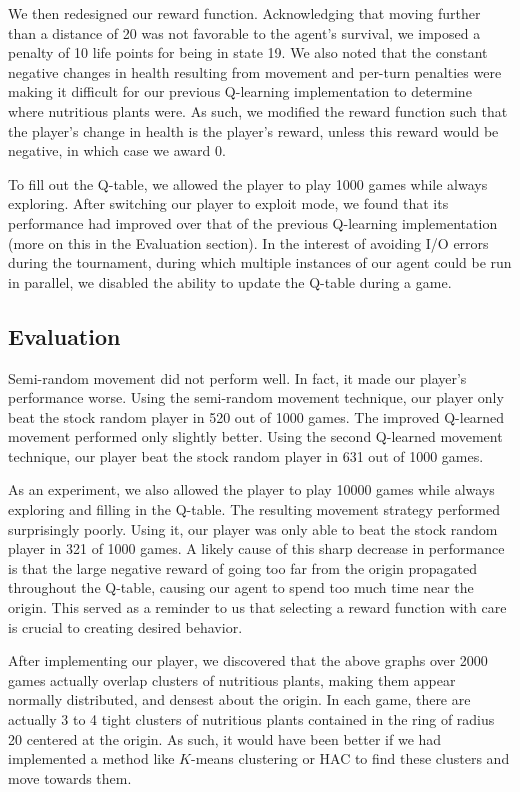 \documentclass[solution, letterpaper]{cs121}
\begin{document}
We then redesigned our reward function. Acknowledging that moving further than a distance of 20 was not favorable to the agent's survival, we imposed a penalty of 10 life points for being in state 19. We also noted that the constant negative changes in health resulting from movement and per-turn penalties were making it difficult for our previous Q-learning implementation to determine where nutritious plants were. As such, we modified the reward function such that the player's change in health is the player's reward, unless this reward would be negative, in which case we award 0.

To fill out the Q-table, we allowed the player to play 1000 games while always exploring. After switching our player to exploit mode, we found that its performance had improved over that of the previous Q-learning implementation (more on this in the Evaluation section). In the interest of avoiding I/O errors during the tournament, during which multiple instances of our agent could be run in parallel, we disabled the ability to update the Q-table during a game.

\subsection{Evaluation}
\hspace{4mm} Semi-random movement did not perform well. In fact, it made our player's performance worse. Using the semi-random movement technique, our player only beat the stock random player in 520 out of 1000 games. The improved Q-learned movement performed only slightly better. Using the second Q-learned movement technique, our player beat the stock random player in 631 out of 1000 games.

As an experiment, we also allowed the player to play 10000 games while always exploring and filling in the Q-table. The resulting movement strategy performed surprisingly poorly. Using it, our player was only able to beat the stock random player in 321 of 1000 games. A likely cause of this sharp decrease in performance is that the large negative reward of going too far from the origin propagated throughout the Q-table, causing our agent to spend too much time near the origin. This served as a reminder to us that selecting a reward function with care is crucial to creating desired behavior.

After implementing our player, we discovered that the above graphs over 2000 games actually overlap clusters of nutritious plants, making them appear normally distributed, and densest about the origin. In each game, there are actually 3 to 4 tight clusters of nutritious plants contained in the ring of radius 20 centered at the origin. As such, it would have been better if we had implemented a method like $K$-means clustering or HAC to find these clusters and move towards them.
\end{document}
